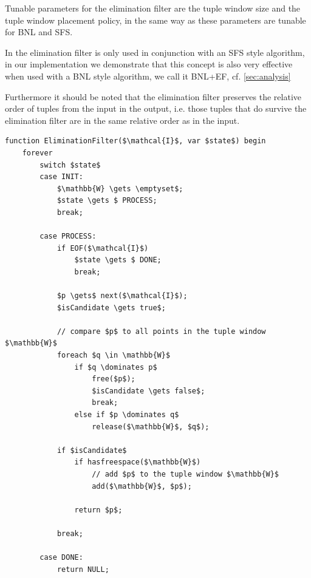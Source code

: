 Tunable parameters for the elimination filter are the tuple window size
and the tuple window placement policy, in the same way as these parameters
are tunable for BNL and SFS.

In \citep{Godfrey2005} the elimination filter is only used in
conjunction with an SFS style algorithm, in our implementation we demonstrate
that this concept is also very effective when used with a BNL style
algorithm, we call it BNL+EF, cf. \autoref{sec:analysis}

Furthermore it should be noted that the elimination filter preserves
the relative order of tuples from the input in the output, i.e. those
tuples that do survive the elimination filter are in the same relative
order as in the input.

\begin{lstlisting}[language=pseudo,
caption={Elimination Filter (EF)},
label={code:ef}
]
function EliminationFilter($\mathcal{I}$, var $state$) begin 
	forever
		switch $state$
		case INIT:
			$\mathbb{W} \gets \emptyset$;
			$state \gets $ PROCESS;
			break;

		case PROCESS:
			if EOF($\mathcal{I}$)
				$state \gets $ DONE;
				break;
	
			$p \gets$ next($\mathcal{I}$);
			$isCandidate \gets true$;

			// compare $p$ to all points in the tuple window $\mathbb{W}$
			foreach $q \in \mathbb{W}$
				if $q \dominates p$
					free($p$);
					$isCandidate \gets false$;
					break;
				else if $p \dominates q$
					release($\mathbb{W}$, $q$);

			if $isCandidate$
				if hasfreespace($\mathbb{W}$)
					// add $p$ to the tuple window $\mathbb{W}$
					add($\mathbb{W}$, $p$);

				return $p$;

			break;

		case DONE:
			return NULL;
\end{lstlisting}



